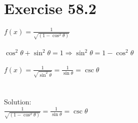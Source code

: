 \documentclass[a4paper, 10pt]{scrartcl}
\begin{document}
\section{Exercise 58.2}

$f(x) = \frac{1}{\sqrt{(1 - \cos^{2}{\theta})}}$\\
\\
$\cos^{2}{\theta} + \sin^{2}{\theta} = 1 \Rightarrow \sin^{2}{\theta} = 1 - \cos^{2}{\theta}$
\\
\\
$f(x) = \frac{1}{\sqrt{\sin^{2}{\theta}}} = \frac{1}{\sin{\theta}} = \csc{\theta}$\\
\\
\\
Solution:\\
$\frac{1}{\sqrt{(1 - \cos^{2}{\theta})}} = \frac{1}{\sin{\theta}} = \csc{\theta}$\\
\end{document}
